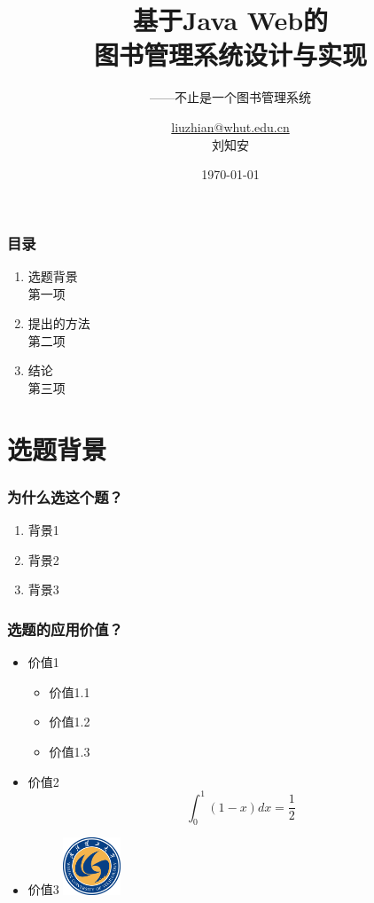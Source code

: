\documentclass{beamer}
\title{基于Java Web的\vspace{0.3cm} \\图书管理系统设计与实现}
\subtitle{——不止是一个图书管理系统}
\author{\small {\url{liuzhian@whut.edu.cn} \\ 刘知安}}
\institute{Wuhan University of Technology}
\date{\today}
\begin{document}
	\setcounter{showProgressBar}{0}
	\setcounter{showSlideNumbers}{0}
	\frame{\titlepage}
    

	\begin{frame}
		\frametitle{目录}
		\begin{enumerate}
			\item 选题背景 \\ \textcolor{whutGrey}{\footnotesize\hspace{1em} 第一项}
			\item 提出的方法  \\ \textcolor{whutGrey}{\footnotesize\hspace{1em} 第二项}
			\item 结论 \\ \textcolor{whutGrey}{\footnotesize\hspace{1em} 第三项}
		\end{enumerate}
	\end{frame}

	\setcounter{framenumber}{0}
	\setcounter{showProgressBar}{1}
	\setcounter{showSlideNumbers}{1}

	\section{选题背景}
		\begin{frame}
			\frametitle{为什么选这个题？}
			\begin{enumerate}
				\item 背景1 \pause
				\item 背景2 \pause
				\item 背景3 \pause
			\end{enumerate}
		\end{frame}

		\begin{frame}
			\frametitle{选题的应用价值？}
			\begin{itemize}
				\item 价值1
					\begin{itemize}
						\item 价值1.1 \pause
						\item 价值1.2 \pause
						\item 价值1.3 \pause
					\end{itemize}
				\item 价值2 \pause
				$$
				\int_0^1{(1-x)dx}=\frac{1}{2}
				$$
				\item 价值3 \pause
					\includegraphics[width=1.7cm]{./imgs/logo.png}
			\end{itemize}
		\end{frame}
	
\end{document}

